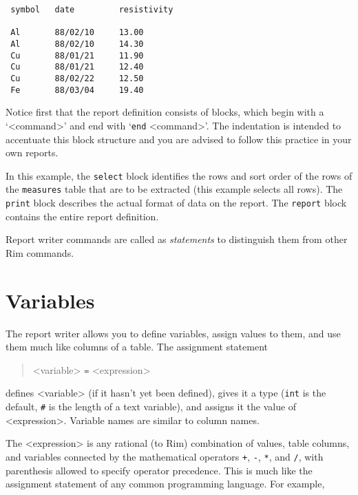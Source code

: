 \documentclass[11pt,a4paper]{report}
\begin{document}
\begin{verbatim}
 symbol   date         resistivity
 
 Al       88/02/10     13.00
 Al       88/02/10     14.30
 Cu       88/01/21     11.90
 Cu       88/01/21     12.40
 Cu       88/02/22     12.50
 Fe       88/03/04     19.40
\end{verbatim}
 
Notice first that the report definition consists of blocks,
which begin with a `<command>' and end with `\verb!end! <command>'.
The indentation is intended to accentuate this block structure
and you are advised to follow this practice in your own reports.
 
 
In this example, the \verb!select! block identifies the rows and sort
order of the rows of the
\verb!measures! table that are to be extracted (this example selects all rows).
The \verb!print! block
describes the actual format of data on the report.
The \verb!report! block contains the entire report definition.
 
\smallskip
{}
Report writer commands are called
as {\em statements} to distinguish them from other Rim commands.
 
\section{Variables}
%
The report writer allows you to define variables, assign values to
them, and use them much like columns of a table.
The assignment statement
\begin{verse}
<variable>  \verb!=! <expression>
\end{verse}
defines <variable> (if it hasn't yet been defined), gives it
a type (\verb!int! is the default, \verb!#! is the length of a text variable),
and assigns it the value of <expression>.
Variable names are similar to column names.
 
The <expression> is any rational (to Rim) combination of values,
table columns, and variables connected by the
mathematical operators \verb!+!, \verb!-!, \verb!*!, and \verb!/!, with parenthesis
allowed to specify operator precedence.
This is much like the assignment statement of any common programming
language. For example,
 
\end{document}
